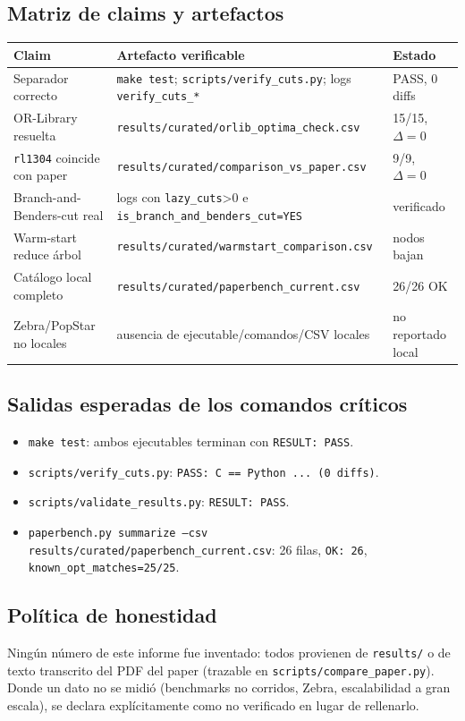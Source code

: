 \subsection{Matriz de claims y artefactos}
\begin{center}\small
\begin{tabular}{p{}p{}p{}}
\toprule
Claim & Artefacto verificable & Estado \\
\midrule
Separador correcto & \texttt{make test}; \texttt{scripts/verify\_cuts.py}; logs
\texttt{verify\_cuts\_*} & PASS, 0 diffs \\
OR-Library resuelta & \texttt{results/curated/orlib\_optima\_check.csv} & 15/15, $\Delta=0$ \\
\texttt{rl1304} coincide con paper & \texttt{results/curated/comparison\_vs\_paper.csv} & 9/9, $\Delta=0$ \\
Branch-and-Benders-cut real & logs con \texttt{lazy\_cuts}>0 e
\texttt{is\_branch\_and\_benders\_cut=YES} & verificado \\
Warm-start reduce árbol & \texttt{results/curated/warmstart\_comparison.csv} & nodos bajan \\
Catálogo local completo & \texttt{results/curated/paperbench\_current.csv} & 26/26 OK \\
Zebra/PopStar no locales & ausencia de ejecutable/comandos/CSV locales & no reportado local \\
\bottomrule
\end{tabular}
\end{center}

\subsection{Salidas esperadas de los comandos críticos}
\begin{itemize}[noitemsep]
  \item \texttt{make test}: ambos ejecutables terminan con \texttt{RESULT: PASS}.
  \item \texttt{scripts/verify\_cuts.py}: \texttt{PASS: C == Python ... (0 diffs)}.
  \item \texttt{scripts/validate\_results.py}: \texttt{RESULT: PASS}.
  \item \texttt{paperbench.py summarize --csv results/curated/paperbench\_current.csv}: 26 filas,
        \texttt{OK: 26}, \texttt{known\_opt\_matches=25/25}.
\end{itemize}

\subsection{Política de honestidad}
Ningún número de este informe fue inventado: todos provienen de \texttt{results/} o de texto
transcrito del PDF del paper (trazable en \texttt{scripts/compare\_paper.py}). Donde un dato no se
midió (benchmarks no corridos, Zebra, escalabilidad a gran escala), se declara explícitamente como
no verificado en lugar de rellenarlo.

